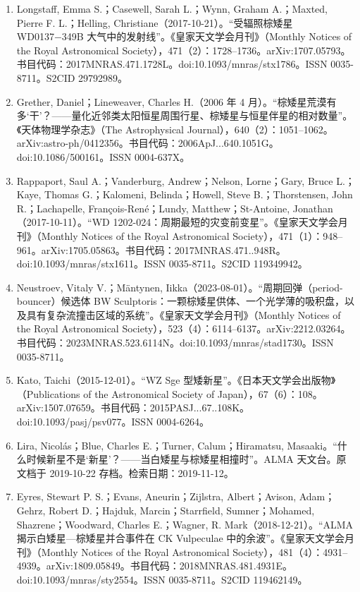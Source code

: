 \begin{enumerate}
\item Longstaff, Emma S.；Casewell, Sarah L.；Wynn, Graham A.；Maxted, Pierre F. L.；Helling, Christiane（2017-10-21）。“受辐照棕矮星 WD0137−349B 大气中的发射线”。《皇家天文学会月刊》（Monthly Notices of the Royal Astronomical Society），471（2）：1728–1736。arXiv:1707.05793。书目代码：2017MNRAS.471.1728L。doi:10.1093/mnras/stx1786。ISSN 0035-8711。S2CID 29792989。
\item Grether, Daniel；Lineweaver, Charles H.（2006 年 4 月）。“棕矮星荒漠有多‘干’？——量化近邻类太阳恒星周围行星、棕矮星与恒星伴星的相对数量”。《天体物理学杂志》（The Astrophysical Journal），640（2）：1051–1062。arXiv:astro-ph/0412356。书目代码：2006ApJ...640.1051G。doi:10.1086/500161。ISSN 0004-637X。
\item Rappaport, Saul A.；Vanderburg, Andrew；Nelson, Lorne；Gary, Bruce L.；Kaye, Thomas G.；Kalomeni, Belinda；Howell, Steve B.；Thorstensen, John R.；Lachapelle, François-René；Lundy, Matthew；St-Antoine, Jonathan（2017-10-11）。“WD 1202-024：周期最短的灾变前变星”。《皇家天文学会月刊》（Monthly Notices of the Royal Astronomical Society），471（1）：948–961。arXiv:1705.05863。书目代码：2017MNRAS.471..948R。doi:10.1093/mnras/stx1611。ISSN 0035-8711。S2CID 119349942。
\item Neustroev, Vitaly V.；Mäntynen, Iikka（2023-08-01）。“周期回弹（period-bouncer）候选体 BW Sculptoris：一颗棕矮星供体、一个光学薄的吸积盘，以及具有复杂流撞击区域的系统”。《皇家天文学会月刊》（Monthly Notices of the Royal Astronomical Society），523（4）：6114–6137。arXiv:2212.03264。书目代码：2023MNRAS.523.6114N。doi:10.1093/mnras/stad1730。ISSN 0035-8711。
\item Kato, Taichi（2015-12-01）。“WZ Sge 型矮新星”。《日本天文学会出版物》（Publications of the Astronomical Society of Japan），67（6）：108。arXiv:1507.07659。书目代码：2015PASJ...67..108K。doi:10.1093/pasj/psv077。ISSN 0004-6264。
\item Lira, Nicolás；Blue, Charles E.；Turner, Calum；Hiramatsu, Masaaki。“什么时候新星不是‘新星’？——当白矮星与棕矮星相撞时”。ALMA 天文台。原文档于 2019-10-22 存档。检索日期：2019-11-12。
\item Eyres, Stewart P. S.；Evans, Aneurin；Zijlstra, Albert；Avison, Adam；Gehrz, Robert D.；Hajduk, Marcin；Starrfield, Sumner；Mohamed, Shazrene；Woodward, Charles E.；Wagner, R. Mark（2018-12-21）。“ALMA 揭示白矮星—棕矮星并合事件在 CK Vulpeculae 中的余波”。《皇家天文学会月刊》（Monthly Notices of the Royal Astronomical Society），481（4）：4931–4939。arXiv:1809.05849。书目代码：2018MNRAS.481.4931E。doi:10.1093/mnras/sty2554。ISSN 0035-8711。S2CID 119462149。

\end{enumerate}
